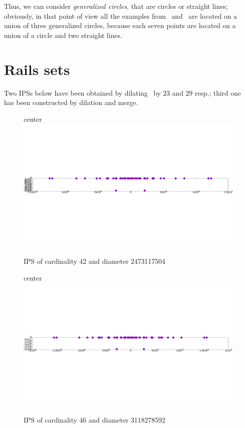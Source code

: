 \documentclass[12pt]{article}
\theoremstyle{theorem}
\theoremstyle{dfn}
\theoremstyle{remark}
\begin{document}
Thus, we can consider \emph{generalized circles}, that are circles or straight lines;
obviously, in that point of view all the examples from~\cite{kreisel2008heptagon} and~\cite{kurz2013constructing}
are located on a union of three generalized circles,
because each seven points are located on a union of a circle and two straight lines.




\section{Rails sets}

Two IPSs below have been obtained by dilating~\cite[Fig. 34]{avdeev2019particular} by $23$ and $29$  resp.;
third one has been constructed by dilation and merge.



\begin{figure}[h!]
center{\includegraphics[width=1\linewidth]{./img/42_symm.png}}
\parbox{1\linewidth}{\caption{IPS of cardinality 42 and diameter 2473117504}
\label{42_symm.png}}
\end{figure}

\begin{figure}[h!]
center{\includegraphics[width=1\linewidth]{./img/46_symm.png}}
\parbox{1\linewidth}{\caption{IPS of cardinality 46 and diameter 3118278592}
\label{46_symm.png}}
\end{figure}
\end{document}
